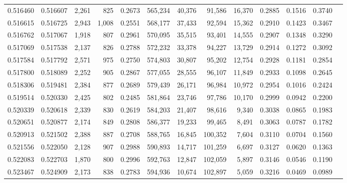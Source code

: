 \begin{tabular}{rrrrrrrrrrrrr}
0.516460 & 0.516607 &  2,261 &   825 &                                     0.2673 & 565,234 &  40,376 &  91,586 &  16,370 & 0.2885 & 0.1516 & 0.3740 \\
0.516615 & 0.516725 &  2,943 & 1,008 &                                     0.2551 & 568,177 &  37,433 &  92,594 &  15,362 & 0.2910 & 0.1423 & 0.3467 \\
0.516762 & 0.517067 &  1,918 &   807 &                                     0.2961 & 570,095 &  35,515 &  93,401 &  14,555 & 0.2907 & 0.1348 & 0.3290 \\
0.517069 & 0.517538 &  2,137 &   826 &                                     0.2788 & 572,232 &  33,378 &  94,227 &  13,729 & 0.2914 & 0.1272 & 0.3092 \\
0.517584 & 0.517792 &  2,571 &   975 &                                     0.2750 & 574,803 &  30,807 &  95,202 &  12,754 & 0.2928 & 0.1181 & 0.2854 \\
0.517800 & 0.518089 &  2,252 &   905 &                                     0.2867 & 577,055 &  28,555 &  96,107 &  11,849 & 0.2933 & 0.1098 & 0.2645 \\
0.518306 & 0.519481 &  2,384 &   877 &                                     0.2689 & 579,439 &  26,171 &  96,984 &  10,972 & 0.2954 & 0.1016 & 0.2424 \\
0.519514 & 0.520330 &  2,425 &   802 &                                     0.2485 & 581,864 &  23,746 &  97,786 &  10,170 & 0.2999 & 0.0942 & 0.2200 \\
0.520339 & 0.520618 &  2,339 &   830 &                                     0.2619 & 584,203 &  21,407 &  98,616 &   9,340 & 0.3038 & 0.0865 & 0.1983 \\
0.520651 & 0.520877 &  2,174 &   849 &                                     0.2808 & 586,377 &  19,233 &  99,465 &   8,491 & 0.3063 & 0.0787 & 0.1782 \\
0.520913 & 0.521502 &  2,388 &   887 &                                     0.2708 & 588,765 &  16,845 & 100,352 &   7,604 & 0.3110 & 0.0704 & 0.1560 \\
0.521556 & 0.522050 &  2,128 &   907 &                                     0.2988 & 590,893 &  14,717 & 101,259 &   6,697 & 0.3127 & 0.0620 & 0.1363 \\
0.522083 & 0.522703 &  1,870 &   800 &                                     0.2996 & 592,763 &  12,847 & 102,059 &   5,897 & 0.3146 & 0.0546 & 0.1190 \\
0.523467 & 0.524909 &  2,173 &   838 &                                     0.2783 & 594,936 &  10,674 & 102,897 &   5,059 & 0.3216 & 0.0469 & 0.0989 \\

\end{tabular}
